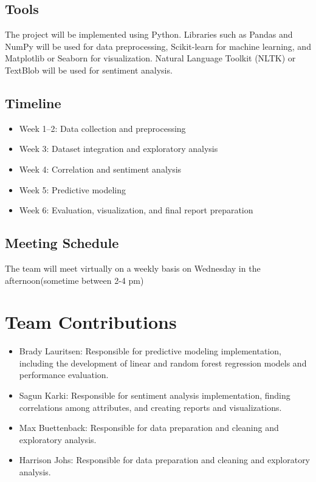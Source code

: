 \documentclass[conference]{IEEEtran}
\begin{document}
\subsection{Tools}
The project will be implemented using Python. Libraries such as
Pandas and NumPy will be used for data preprocessing, Scikit-learn
for machine learning, and Matplotlib or Seaborn for visualization.
Natural Language Toolkit (NLTK) or TextBlob will be used for
sentiment analysis.

\subsection{Timeline}
\begin{itemize}
  \item Week 1--2: Data collection and preprocessing
  \item Week 3: Dataset integration and exploratory analysis
  \item Week 4: Correlation and sentiment analysis
  \item Week 5: Predictive modeling
  \item Week 6: Evaluation, visualization, and final report preparation
\end{itemize}

\subsection{Meeting Schedule}

The team will meet virtually on a weekly basis on Wednesday in the afternoon(sometime between 2-4 pm)

\section{Team Contributions}

\begin{itemize}
  \item Brady Lauritsen: Responsible for predictive modeling implementation, including the development of linear and random forest regression models and performance evaluation.
  \item Sagun Karki: Responsible for sentiment analysis implementation, finding correlations among attributes, and creating reports and visualizations.
  \item Max Buettenback: Responsible for data preparation and cleaning and exploratory analysis.
  \item Harrison Johs: Responsible for data preparation and cleaning and exploratory analysis.
\end{itemize}
\end{document}
